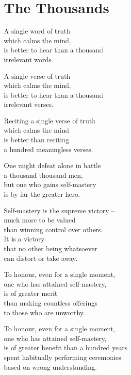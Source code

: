 
\chapter{The Thousands}


A single word of truth\\
which calms the mind,\\
is better to hear than a thousand\\
irrelevant words.


A single verse of truth\\
which calms the mind,\\
is better to hear than a thousand\\
irrelevant verses.


Reciting a single verse of truth\\
which calms the mind\\
is better than reciting\\
a hundred meaningless verses.


One might defeat alone in battle\\
a thousand thousand men,\\
but one who gains self-mastery\\
is by far the greater hero.


Self-mastery is the supreme victory --\\
much more to be valued\\
than winning control over others.\\
It is a victory\\
that no other being whatsoever\\
can distort or take away.


To honour, even for a single moment,\\
one who has attained self-mastery,\\
is of greater merit\\
than making countless offerings\\
to those who are unworthy.


To honour, even for a single moment,\\
one who has attained self-mastery,\\
is of greater benefit than a hundred years\\
spent habitually performing ceremonies\\
based on wrong understanding.

